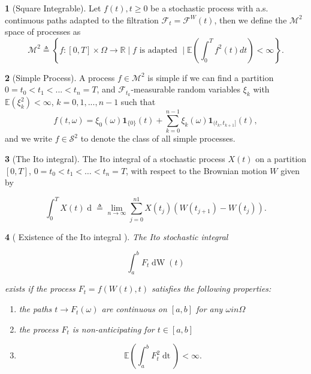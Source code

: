 \documentclass[british]{amsart} \usepackage{lmodern}
\numberwithin{equation}{section} \numberwithin{figure}{section}
\theoremstyle{plain} \newtheorem{thm}{\protect\theoremname}[section]
\theoremstyle{definition} \newtheorem{defn}[thm]{\protect\definitionname}
\theoremstyle{plain} \newtheorem{assumption}[thm]{\protect\assumptionname}
\theoremstyle{plain} \newtheorem{lem}[thm]{\protect\lemmaname}
\theoremstyle{plain} \newtheorem{prop}[thm]{\protect\propositionname}
\theoremstyle{remark} \newtheorem{rem}[thm]{\protect\remarkname}
\theoremstyle{plain} \newtheorem{cor}[thm]{\protect\corollaryname}
\renewcommand{\d}[1]{\mathop{\mathrm{d}{#1}}}
\newcommand{\defeq}{\mathop{\triangleq}} \newcommand{\almostsurely}{\text{a.s.}}
\begin{document}
\begin{defn} [Square Integrable]
  Let $f(t),t\ge0$ be a stochastic process with a.s. continuous paths
  adapted to the filtration $\mathcal{F}_{t}=\mathcal{F}^{W}(t)$, then
  we define the $\mathcal{M}^{2}$ space of processes as
  \begin{equation} 
    \mathcal{M}^{2} \defeq 
        \left\{
          f : [0,T] \times \Omega \to \mathbb{R} \mid
          f \text{ is adapted } \mid
          \mathbb{E} \left( \int_{0}^{T} f^{2}(t) dt \right) < \infty
        \right\}.
  \end{equation}
\end{defn}

\begin{defn} [Simple Process]
  A process $f\in\mathcal{M}^{2}$ is simple if we can find
  a partition $0=t_{0}<t_{1}<...<t_{n}=T$, and $\mathcal{F}_{t_{k}}$-measurable
  random variables $\xi_{k}$ with $\mathbb{E}(\xi_{k}^{2})<\infty$,
  $k=0,1,...,n-1$ such that
  \begin{equation}
    f(t,\omega)=\xi_{0}(\omega)\mathbf{1}_{\{0\}}(t)+\sum_{k=0}^{n-1}\xi_{k}(\omega)\mathbf{1}_{(t_{k},t_{k+1}]}(t),
  \end{equation}
 and we write $f\in\mathcal{S}^{2}$ to denote the class of all simple processes.
\end{defn}

\begin{defn} [The Ito integral]
  The Ito integral of a stochastic process $X(t)$ on a partition
  $[0,T]$, $0=t_{0}<t_{1}<\ldots<t_{n}=T$, with respect to the Brownian
  motion $W$ given by

  \begin{equation}
    \int_{0}^{T}X(t)\d{W(t)}\triangleq\lim_{n\to\infty}\sum_{j=0}^{n1}X(t_{j})\left(W(t_{j+1})-W(t_{j})\right).
  \end{equation}

\end{defn}

\begin{prop} 
  [
    {\cite{shreve1991}}
    Existence of the Ito integral
  ]
  
  The Ito stochastic integral 
  
  \begin{equation*}
    \int_{a}^{b} F_t \d{W}(t)
  \end{equation*}

  exists if the process $F_t = f(W(t),t)$ satisfies the following properties:

  \begin{enumerate}
    \item the paths $t \to F_t(\omega)$ are continuous on $[a,b]$ for any $\omega in \Omega$
    \item the process $F_t$ is non-anticipating for $t \in [a,b]$
    \item 
      \begin{equation*}
        \mathbb{E} \left( \int_{a}^{b} F^{2}_{t} \d{t} \right) < \infty.
      \end{equation*}
  \end{enumerate}
\end{prop}
\end{document}
